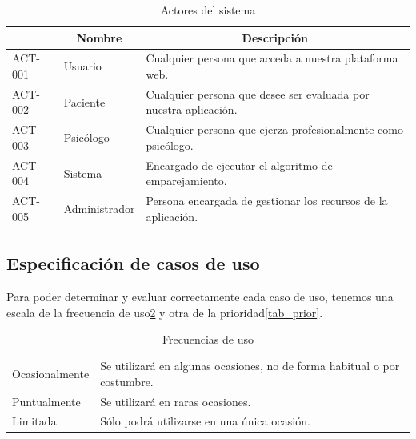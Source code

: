 \begin{table}[htpb]
\centering
\begin{tabularx}{\textwidth}{|l|X|X|}
\hline
\rowcolor[gray]{0.9}\multicolumn{1}{|c|}{\textbf{Identificador}} & \multicolumn{1}{c|}{\textbf{Nombre}} & \multicolumn{1}{c|}{\textbf{Descripción}}                                 \\ \hline
ACT-001                             & Usuario                     & Cualquier persona que acceda a nuestra plataforma web.           \\ \hline
ACT-002                             & Paciente                    & Cualquier persona que desee ser evaluada por nuestra aplicación. \\ \hline
ACT-003                             & Psicólogo                   & Cualquier persona que ejerza profesionalmente como psicólogo.    \\ \hline
ACT-004                             & Sistema                     & Encargado de ejecutar el algoritmo de emparejamiento.            \\ \hline
ACT-005                             & Administrador               & Persona encargada de gestionar los recursos de la aplicación.    \\ \hline
\end{tabularx}
\caption{Actores del sistema}
\label{tab_actores}
\end{table}


\subsection{Especificación de casos de uso}
Para poder determinar y evaluar correctamente cada caso de uso, tenemos una escala de la frecuencia de uso\ref{tab_frec_uso} y otra de la prioridad\ref{tab_prior}.

\begin{table}[htpb]
\centering
\begin{tabularx}{\textwidth}{|l|X|}
\hline
\rowcolor[gray]{0.9}\multicolumn{2}{|c|}{\textbf{Frecuencia de uso}}                                                   \\ \hline
Ocasionalmente & Se utilizará en algunas ocasiones, no de forma habitual o por costumbre. \\ \hline
Puntualmente   & Se utilizará en raras ocasiones.                                         \\ \hline
Limitada       & Sólo podrá utilizarse en una única ocasión.                              \\ \hline
\end{tabularx}
\caption{Frecuencias de uso}
\label{tab_frec_uso}
\end{table}


